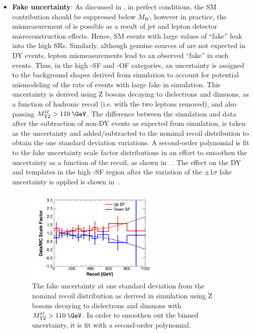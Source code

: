 \begin{itemize}
\item \textbf{Fake \ptmiss uncertainty}: As discussed in , in perfect conditions, the SM \ttll contribution should be suppressed below $M_W$, however in practice, the mismeasurement of \ptmiss is possible as a result of jet and lepton detector misreconstruction effects. Hence, SM \ttll events with large values of ``fake'' \ptmiss leak into the high \mttll SRs. Similarly, although genuine sources of \ptmiss are not expected in DY events, lepton mismeasurements lead to an observed ``fake'' \ptmiss in such events. Thus, in the high \mttll-SF and \mttll-OF categories, an uncertainty is assigned to the background \ptmiss shapes derived from simulation to account for potential mismodeling of the rate of events with large fake \ptmiss in simulation. This uncertainty is derived using Z bosons decaying to dielectrons and dimuons, as a function of hadronic recoil (i.e. \ptmiss with the two leptons removed), and also passing $\mttll > 110\:\GeV$. The difference between the simulation and data after the subtraction of non-DY events as expected from simulation, is taken as the uncertainty and added/subtracted to the nominal recoil distribution to obtain the one standard deviation variations. A second-order polynomial is fit to the fake \ptmiss uncertainty scale factor distributions in an effort to smoothen the uncertainty as a function of the recoil, as shown in ~. The effect on the DY and \ttll templates in the high \mttll-SF region after the variation of the $\pm 1\sigma$ fake \ptmiss uncertainty is applied is shown in~.

  \begin{figure}[h] 
    \centering
    \includegraphics[width=0.6\textwidth]{figs/RecoilUpFit.png}
    \caption{The fake \ptmiss uncertainty at one standard deviation from the nominal recoil distribution as derived in simulation using Z bosons decaying to dielectrons and dimuons with $\mttll > 110\:\GeV$. In order to smoothen out the binned uncertainty, it is fit with a second-order polynomial.}
    \label{fig:recoilSF}
  \end{figure}


\end{itemize}
